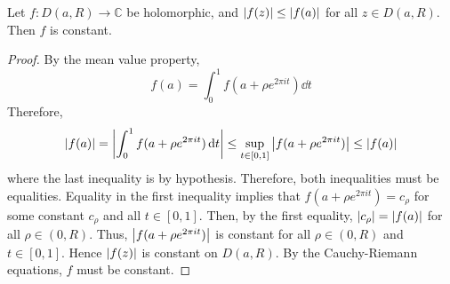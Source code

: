 \begin{theorem}
	Let \( f \colon D(a,R) \to \mathbb C \) be holomorphic, and \( \abs{f(z)} \leq \abs{f(a)} \) for all \( z \in D(a,R) \).
	Then \( f \) is constant.
\end{theorem}
\begin{proof}
	By the mean value property,
	\[ f(a) = \int_0^1 f(a+\rho e^{2 \pi i t}) \dd{t} \]
	Therefore,
	\[ \abs{f(a)} = \abs{\int_0^1 f(a + \rho e^{2 \pi i t}) \dd{t}} \leq \sup_{t \in [0,1]} \abs{f(a+\rho e^{2 \pi i t})} \leq \abs{f(a)} \]
	where the last inequality is by hypothesis.
	Therefore, both inequalities must be equalities.
	Equality in the first inequality implies that \( f(a+\rho e^{2 \pi i t}) = c_\rho \) for some constant \( c_\rho \) and all \( t \in [0,1] \).
	Then, by the first equality, \( \abs{c_\rho} = \abs{f(a)} \) for all \( \rho \in (0,R) \).
	Thus, \( \abs{f(a+\rho e^{2 \pi i t})} \) is constant for all \( \rho \in (0,R) \) and \( t \in [0,1] \).
	Hence \( \abs{f(z)} \) is constant on \( D(a,R) \).
	By the Cauchy-Riemann equations, \( f \) must be constant.
\end{proof}

